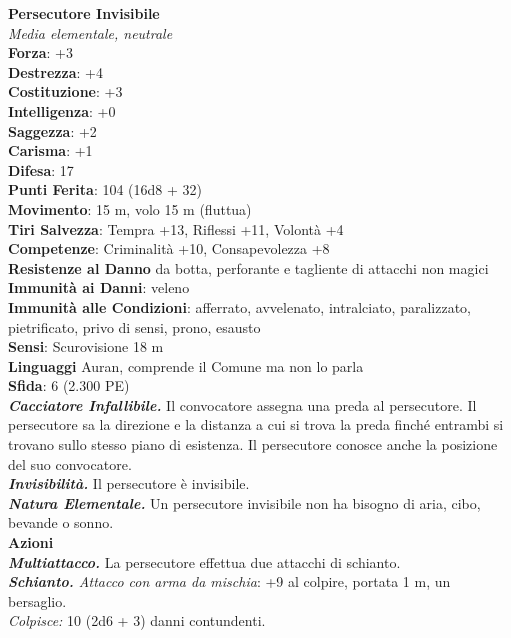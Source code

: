 \begin{multicols}{2}
\medskip\textbf{Persecutore Invisibile}\\
\emph{Media elementale, neutrale}\\
\textbf{Forza}: +3\\
\textbf{Destrezza}: +4\\
\textbf{Costituzione}: +3\\
\textbf{Intelligenza}: +0\\
\textbf{Saggezza}: +2\\
\textbf{Carisma}: +1\\
\textbf{Difesa}: 17\\
\textbf{Punti Ferita}: 104 (16d8 + 32)\\
\textbf{Movimento}: 15 m, volo 15 m (fluttua)\\
\textbf{Tiri Salvezza}: Tempra +13, Riflessi +11, Volontà +4\\
\textbf{Competenze}: Criminalità +10, Consapevolezza +8\\
\textbf{Resistenze al Danno} da botta, perforante e tagliente di attacchi non magici\\
\textbf{Immunità ai Danni}: veleno\\
\textbf{Immunità alle Condizioni}: afferrato, avvelenato, intralciato, paralizzato, pietrificato, privo di sensi, prono, esausto\\
\textbf{Sensi}: Scurovisione 18 m\\
\textbf{Linguaggi} Auran, comprende il Comune ma non lo parla \\
\textbf{Sfida}: 6 (2.300 PE)\smallskip\\
\emph{\textbf{Cacciatore Infallibile.}} Il convocatore assegna una preda al persecutore. Il persecutore sa la direzione e la distanza a cui si trova la preda finché entrambi si trovano sullo stesso piano di esistenza. Il persecutore conosce anche la posizione del suo convocatore.\\
\emph{\textbf{Invisibilità.}} Il persecutore è invisibile.\\
\emph{\textbf{Natura Elementale.}} Un persecutore invisibile non ha bisogno di aria, cibo, bevande o sonno.\\
\smallskip\textbf{Azioni}\\
\emph{\textbf{Multiattacco.}} La persecutore effettua due attacchi di schianto.\\
\emph{\textbf{Schianto.} Attacco con arma da mischia}: +9 al colpire, portata 1 m, un bersaglio.\\
\emph{Colpisce:} 10 (2d6 + 3) danni contundenti.\\


\end{multicols}
